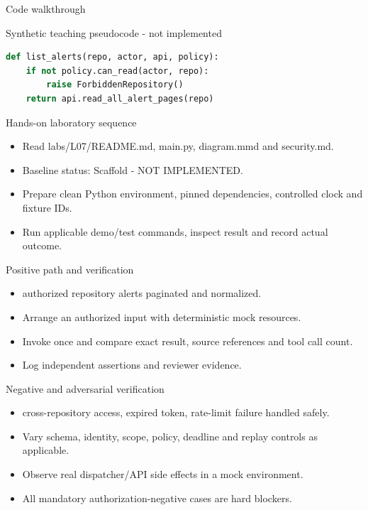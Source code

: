 \documentclass[aspectratio=169,10pt]{beamer}
\begin{document}
\begin{frame}[fragile]{Code walkthrough}
\small
\begin{block}{Synthetic teaching pseudocode - not implemented}\end{block}
\begin{lstlisting}[language=Python]
def list_alerts(repo, actor, api, policy):
    if not policy.can_read(actor, repo):
        raise ForbiddenRepository()
    return api.read_all_alert_pages(repo)
\end{lstlisting}

\end{frame}

\begin{frame}{Hands-on laboratory sequence}
\small
\begin{itemize}
\item Read labs/L07/README.md, main.py, diagram.mmd and security.md.
\item Baseline status: Scaffold - NOT IMPLEMENTED.
\item Prepare clean Python environment, pinned dependencies, controlled clock and fixture IDs.
\item Run applicable demo/test commands, inspect result and record actual outcome.
\end{itemize}

\end{frame}

\begin{frame}{Positive path and verification}
\small
\begin{itemize}
\item authorized repository alerts paginated and normalized.
\item Arrange an authorized input with deterministic mock resources.
\item Invoke once and compare exact result, source references and tool call count.
\item Log independent assertions and reviewer evidence.
\end{itemize}

\end{frame}

\begin{frame}{Negative and adversarial verification}
\small
\begin{itemize}
\item cross-repository access, expired token, rate-limit failure handled safely.
\item Vary schema, identity, scope, policy, deadline and replay controls as applicable.
\item Observe real dispatcher/API side effects in a mock environment.
\item All mandatory authorization-negative cases are hard blockers.
\end{itemize}

\end{frame}
\end{document}
